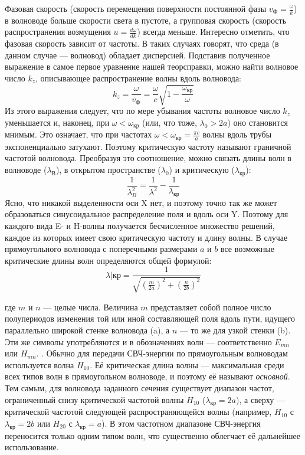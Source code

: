 \documentclass[a4paper,12pt]{article}
\begin{document}
Фазовая скорость (скорость перемещения поверхности постоянной фазы $v_{\text{Ф}} = \frac{\omega}{k}$) в волноводе больше скорости света в пустоте, а групповая скорость (скорость распространения возмущения $u = \frac{d\omega}{dk}$) всегда меньше. Интересно отметить, что фазовая скорость зависит от частоты. В таких случаях говорят, что среда (в данном случае — волновод) обладает дисперсией.
Подставив полученное выражение в самое первое уравнение нашей теорсправки, можно найти волновое число $k_z$, описывающее распространение волны вдоль волновода:
\begin{equation}
    k_z = \frac{\omega}{v_{\text{Ф}}} = \frac{\omega}{c} \sqrt{1 - \frac{\omega_{\text{кр}}}{\omega}}
\end{equation}
Из этого выражения следует, что по мере убывания частоты волновое число
$k_z$ уменьшается и, наконец, при $\omega < \omega_{\text{кр}}$ (или, что тоже, $\lambda_0 > 2a$)
оно становится мнимым. Это означает, что при частотах $\omega < \omega_{\text{кр}} = \frac{\pi c}{a}$ волны вдоль трубы экспоненциально затухают. Поэтому критическую частоту называют граничной частотой волновода.
Преобразуя это соотношение, можно связать длины волн в волноводе ($\lambda_{\text{В}}$), в открытом пространстве ($\lambda_0$) и критическую ($\lambda_{\text{кр}}$):
\begin{equation}
    \frac{1}{\lambda^2_B} = \frac{1}{\lambda^2} - \frac{1}{\lambda_{\text{кр}}}
\end{equation}
Ясно, что никакой выделенности оси X нет, и поэтому точно так же может образоваться синусоидальное распределение поля и вдоль оси Y. Поэтому для каждого вида E- и H-волны получается бесчисленное множество решений, каждое из которых имеет свою критическую частоту и длину волны. В случае прямоугольного волновода с поперечными размерами $a$ и $b$ все возможные критические длины волн определяются общей формулой:
\begin{equation}
    \lambda|{\text{кр}} = \frac{1}{\sqrt{(\frac{m}{2a})^2 + (\frac{n}{2b})^2}}
\end{equation}

где $m$ и $n$ — целые числа. Величина $m$ представляет собой полное число полупериодов изменения той или иной составляющей поля вдоль пути, идущего параллельно широкой стенке волновода (a), а $n$ — то же для узкой стенки (b). Эти же символы употребляются и в обозначениях волн — соответственно $E_{mn}$ или $H_{mn}$. . Обычно для передачи СВЧ-энергии по прямоугольным волноводам используется волна $H_{10}$. Её критическая длина волны — максимальная среди всех типов волн в прямоугольном волноводе, и поэтому её называют \textit{основной}. Тем самым, для волновода заданного сечения существует диапазон частот, ограниченный снизу критической частотой волны $H_{10}$ ($\lambda_{\text{кр}} = 2a$), а сверху — критической частотой следующей распространяющейся волны (например, $H_{10}$ с $\lambda_{\text{кр}} = 2b$ или $H_{20}$ с $\lambda_{\text{кр}} = a$). В этом частотном диапазоне СВЧ-энергия переносится только одним типом волн, что существенно облегчает её дальнейшее использование. \\
\end{document}

